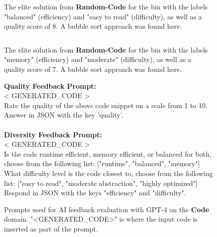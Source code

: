 \begin{figure}[ht]
\inputminted[mathescape,
               linenos,
               numbersep=5pt,
               gobble=0,
               frame=lines,
               framesep=2mm,
               breaklines, 
               breakautoindent=true]{python}{main_figures/extensions/code_samples/random_balanced_easy_8.py}
\caption{The elite solution from \textbf{Random-Code} for the bin with the labels "balanced" (efficiency) and "easy to read" (difficulty), as well as a quality score of 8. A bubble sort approach was found here.}
\label{app:fig:code_random_sample_1}
\end{figure}

\begin{figure}[ht]
\inputminted[mathescape,
               linenos,
               numbersep=5pt,
               gobble=0,
               frame=lines,
               framesep=2mm,
               breaklines, 
               breakautoindent=true]{python}{main_figures/extensions/code_samples/random_memory_moderate_7.py}
\caption{The elite solution from \textbf{Random-Code} for the bin with the labels "memory" (efficiency) and "moderate" (difficulty), as well as a quality score of 7. A bubble sort approach was found here.}
\label{app:fig:code_random_sample_2}
\end{figure}

\begin{figure}[ht]
\centering
\begin{boxedminipage}{0.98\textwidth}
\textbf{Quality Feedback Prompt:}\\
\textless{} GENERATED\_CODE \textgreater{}\\
Rate the quality of the above code snippet on a scale from 1 to 10. Answer in JSON with the key 'quality'.\\
\\
\textbf{Diversity Feedback Prompt:}\\
\textless{} GENERATED\_CODE \textgreater{}\\
Is the code runtime efficient, memory efficient, or balanced for both, choose from the following list: ["runtime", "balanced", "memory"]\\
What difficulty level is the code closest to, choose from the following list: ["easy to read", "moderate abstraction", "highly optimized"]\\

Respond in JSON with the keys "efficiency" and "difficulty".
\end{boxedminipage}
\caption{Prompts used for AI feedback evaluation with GPT-4 \citep{openai2023gpt4} on the \textbf{Code} domain. "<GENERATED\_CODE>" is where the input code is inserted as part of the prompt.}
\label{app:fig:code_feedback}
\end{figure}

